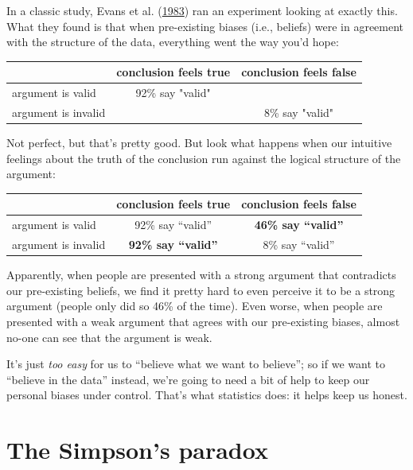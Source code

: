 \documentclass[
  11pt,
]{book}
\theoremstyle{definition}
\theoremstyle{definition}
\theoremstyle{definition}
\theoremstyle{definition}
\theoremstyle{remark}
\begin{document}
In a classic study, Evans et al. (\protect\hyperlink{ref-Evans1983}{1983}) ran an experiment looking at exactly this. What they found is that when pre-existing biases (i.e., beliefs) were in agreement with the structure of the data, everything went the way you'd hope:

\begin{table}[H]
\centering
\begin{tabular}{lcc}
\toprule
  & conclusion feels true & conclusion feels false\\
\midrule
argument is valid & 92\% say "valid" & \\
argument is invalid &  & 8\% say "valid"\\
\bottomrule
\end{tabular}
\end{table}

Not perfect, but that's pretty good. But look what happens when our intuitive feelings about the truth of the conclusion run against the logical structure of the argument:

\begin{longtable}[]{@{}lcc@{}}
\toprule()
& conclusion feels true & conclusion feels false \\
\midrule()
\endhead
argument is valid & 92\% say ``valid'' & \textbf{46\% say ``valid''} \\
argument is invalid & \textbf{92\% say ``valid''} & 8\% say ``valid'' \\
\bottomrule()
\end{longtable}

Apparently, when people are presented with a strong argument that contradicts our pre-existing beliefs, we find it pretty hard to even perceive it to be a strong argument (people only did so 46\% of the time). Even worse, when people are presented with a weak argument that agrees with our pre-existing biases, almost no-one can see that the argument is weak.

It's just \emph{too easy} for us to ``believe what we want to believe''; so if we want to ``believe in the data'' instead, we're going to need a bit of help to keep our personal biases under control. That's what statistics does: it helps keep us honest.

\pagebreak[3]

\hypertarget{the-simpsons-paradox}{%
\section{The Simpson's paradox}\label{the-simpsons-paradox}}
\end{document}
